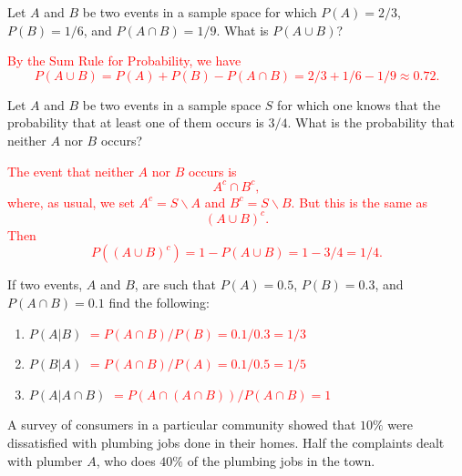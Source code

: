 \documentclass[12pt,reqno]{amsart}
\begin{document}
\bigskip
\prob Let $A$ and $B$ be two events in a sample space for which $P(A) = 2/3$, $P(B) = 1/6$, and $P(A \cap B) = 1/9$. What is $P(A \cup B)$?


\bigskip
\textcolor{red}{By the Sum Rule for Probability, we have
    \[P(A\cup B) = P(A) + P(B) - P(A\cap B) = 2/3 + 1/6 - 1/9 \approx 0.72. \]}















\bigskip
\prob Let $A$ and $B$ be two events in a sample space $S$ for which one knows that the probability that at least one of them occurs is $3/4$. What is the probability that neither $A$ nor $B$ occurs?

\bigskip
\textcolor{red}{The event that neither $A$ nor $B$ occurs is
    \[A^c \cap B^c,\]
where, as usual, we set $A^c = S\smallsetminus A$ and $B^c = S\smallsetminus B$. But this is the same as
    \[(A\cup B)^c.\]
Then
    \[P((A\cup B)^c) = 1 - P(A\cup B) = 1 - 3/4 = 1/4.\]}










    \bigskip
\prob If two events, $A$ and $B$, are such that $P(A)=0.5$, $P(B)=0.3$, and $P(A\cap B)=0.1$ find the following:

\medskip
\begin{enumerate}
    \item $P(A|B)$ \textcolor{red}{$=P(A\cap B)/P(B) = 0.1/0.3 = 1/3$}
    \item $P(B|A)$ \textcolor{red}{$=P(A\cap B)/P(A) = 0.1/0.5 = 1/5$}
    \item $P(A |A\cap B)$ \textcolor{red}{$=P(A\cap (A\cap B))/P(A\cap B) = 1$}
\end{enumerate}









\bigskip
\prob A survey of consumers in a particular community showed that $10\%$ were dissatisfied with plumbing jobs done in their homes. Half the complaints dealt with plumber $A$, who does $40\%$ of the plumbing jobs in the town.
\end{document}
